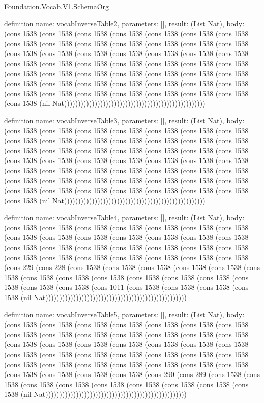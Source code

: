 \begin{lexlean}{Foundation.Vocab.V1.SchemaOrg}
\begin{semanticmodule}
definition{
  name: vocabInverseTable2,
  parameters: [],
  result: (List Nat),
  body: (cons 1538 (cons 1538 (cons 1538 (cons 1538 (cons 1538 (cons 1538 (cons 1538 (cons 1538 (cons 1538 (cons 1538 (cons 1538 (cons 1538 (cons 1538 (cons 1538 (cons 1538 (cons 1538 (cons 1538 (cons 1538 (cons 1538 (cons 1538 (cons 1538 (cons 1538 (cons 1538 (cons 1538 (cons 1538 (cons 1538 (cons 1538 (cons 1538 (cons 1538 (cons 1538 (cons 1538 (cons 1538 (cons 1538 (cons 1538 (cons 1538 (cons 1538 (cons 1538 (cons 1538 (cons 1538 (cons 1538 (cons 1538 (cons 1538 (cons 1538 (cons 1538 (cons 1538 (cons 1538 (cons 1538 (cons 1538 (cons 1538 (cons 1538 (nil Nat)))))))))))))))))))))))))))))))))))))))))))))))))))
}

definition{
  name: vocabInverseTable3,
  parameters: [],
  result: (List Nat),
  body: (cons 1538 (cons 1538 (cons 1538 (cons 1538 (cons 1538 (cons 1538 (cons 1538 (cons 1538 (cons 1538 (cons 1538 (cons 1538 (cons 1538 (cons 1538 (cons 1538 (cons 1538 (cons 1538 (cons 1538 (cons 1538 (cons 1538 (cons 1538 (cons 1538 (cons 1538 (cons 1538 (cons 1538 (cons 1538 (cons 1538 (cons 1538 (cons 1538 (cons 1538 (cons 1538 (cons 1538 (cons 1538 (cons 1538 (cons 1538 (cons 1538 (cons 1538 (cons 1538 (cons 1538 (cons 1538 (cons 1538 (cons 1538 (cons 1538 (cons 1538 (cons 1538 (cons 1538 (cons 1538 (cons 1538 (cons 1538 (cons 1538 (cons 1538 (nil Nat)))))))))))))))))))))))))))))))))))))))))))))))))))
}

definition{
  name: vocabInverseTable4,
  parameters: [],
  result: (List Nat),
  body: (cons 1538 (cons 1538 (cons 1538 (cons 1538 (cons 1538 (cons 1538 (cons 1538 (cons 1538 (cons 1538 (cons 1538 (cons 1538 (cons 1538 (cons 1538 (cons 1538 (cons 1538 (cons 1538 (cons 1538 (cons 1538 (cons 1538 (cons 1538 (cons 1538 (cons 1538 (cons 1538 (cons 1538 (cons 1538 (cons 1538 (cons 1538 (cons 1538 (cons 229 (cons 228 (cons 1538 (cons 1538 (cons 1538 (cons 1538 (cons 1538 (cons 1538 (cons 1538 (cons 1538 (cons 1538 (cons 1538 (cons 1538 (cons 1538 (cons 1538 (cons 1538 (cons 1538 (cons 1011 (cons 1538 (cons 1538 (cons 1538 (cons 1538 (nil Nat)))))))))))))))))))))))))))))))))))))))))))))))))))
}

definition{
  name: vocabInverseTable5,
  parameters: [],
  result: (List Nat),
  body: (cons 1538 (cons 1538 (cons 1538 (cons 1538 (cons 1538 (cons 1538 (cons 1538 (cons 1538 (cons 1538 (cons 1538 (cons 1538 (cons 1538 (cons 1538 (cons 1538 (cons 1538 (cons 1538 (cons 1538 (cons 1538 (cons 1538 (cons 1538 (cons 1538 (cons 1538 (cons 1538 (cons 1538 (cons 1538 (cons 1538 (cons 1538 (cons 1538 (cons 1538 (cons 1538 (cons 1538 (cons 1538 (cons 1538 (cons 1538 (cons 1538 (cons 1538 (cons 1538 (cons 1538 (cons 1538 (cons 290 (cons 289 (cons 1538 (cons 1538 (cons 1538 (cons 1538 (cons 1538 (cons 1538 (cons 1538 (cons 1538 (cons 1538 (nil Nat)))))))))))))))))))))))))))))))))))))))))))))))))))
}


\end{semanticmodule}
\end{lexlean}
